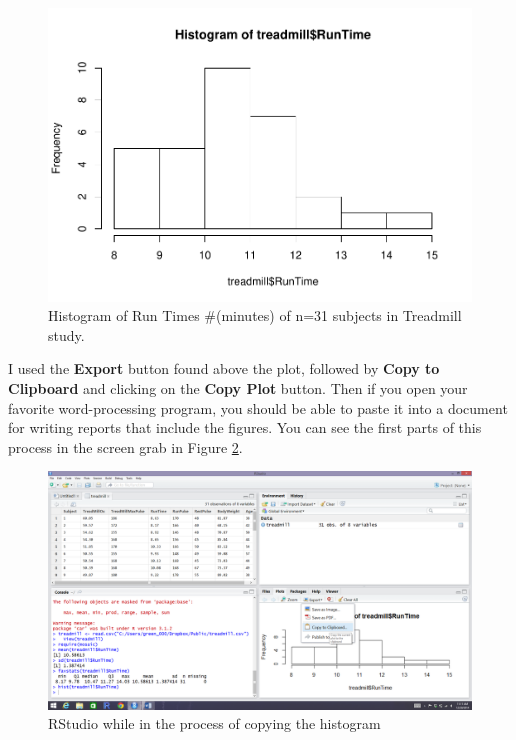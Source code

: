 \documentclass[]{book}
\newenvironment{Shaded}{\begin{snugshade}}{\end{snugshade}}
\newcommand{\KeywordTok}[1]{\textcolor[rgb]{0.13,0.29,0.53}{\textbf{{#1}}}}
\newcommand{\NormalTok}[1]{{#1}}
\begin{document}
\begin{Shaded}
\end{Shaded}

\begin{figure}[htbp]
\centering
\includegraphics{GreenwoodBanner_files/figure-latex/Figure5-1.pdf}
\caption{\label{fig:Figure5}Histogram of Run Times \#(minutes) of n=31 subjects in
Treadmill study.}
\end{figure}

I used the \textbf{Export} button found above the plot, followed by
\textbf{Copy to Clipboard} and clicking on the \textbf{Copy Plot}
button. Then if you open your favorite word-processing program, you
should be able to paste it into a document for writing reports that
include the figures. You can see the first parts of this process in the
screen grab in Figure \ref{fig:Figure6}.



\begin{figure}
\includegraphics[width=26.67in]{chapter0_files/image010} \caption{RStudio while in the process of copying the histogram}\label{fig:Figure6}
\end{figure}
\end{document}
